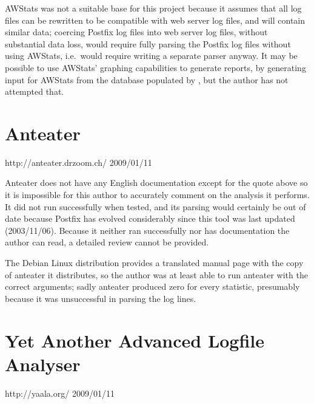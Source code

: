 AWStats was not a suitable base for this project because it assumes that
all log files can be rewritten to be compatible with web server log files,
and will contain similar data; coercing Postfix log files into web server
log files, without substantial data loss, would require fully parsing the
Postfix log files without using AWStats, i.e.\ would require writing a
separate parser anyway.  It may be possible to use AWStats' graphing
capabilities to generate reports, by generating input for AWStats from the
database populated by \parsername{}, but the author has not attempted that.

\section{Anteater}

{http://anteater.drzoom.ch/}
{2009/01/11}

Anteater does not have any English documentation except for the quote above
so it is impossible for this author to accurately comment on the analysis
it performs.  It did not run successfully when tested, and its parsing
would certainly be out of date because Postfix has evolved considerably
since this tool was last updated (2003/11/06).  Because it neither ran
successfully nor has documentation the author can read, a detailed review
cannot be provided.

The Debian Linux distribution provides a translated manual page with the
copy of anteater it distributes, so the author was at least able to run
anteater with the correct arguments; sadly anteater produced zero for every
statistic, presumably because it was unsuccessful in parsing the log lines.

\section{Yet Another Advanced Logfile Analyser}

{http://yaala.org/}
{2009/01/11}

